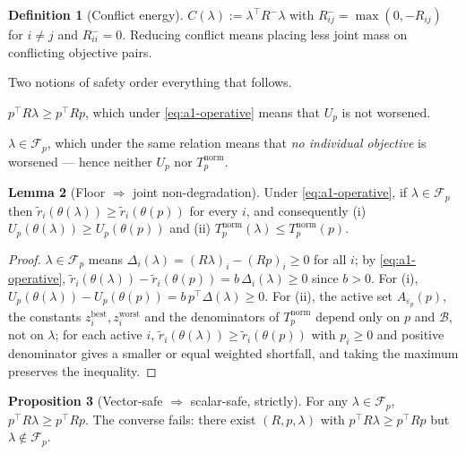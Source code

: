 \documentclass[12pt,a4paper]{report}
\newcommand{\1}{\mathbf{1}}
\newcommand{\Bset}{\mathcal{B}}
\newcommand{\Floor}{\mathcal{F}_{p}}
\theoremstyle{definition}
\newtheorem{definition}{Definition}
\newtheorem{proposition}[definition]{Proposition}
\newtheorem{lemma}[definition]{Lemma}
\begin{document}
\begin{definition}[Conflict energy]
\label{def:conflict-energy}
\(C(\lambda):=\lambda^\top R^-\lambda\) with \(R^-_{ij}=\max(0,-R_{ij})\) for \(i\ne j\) and \(R^-_{ii}=0\). Reducing conflict means placing less joint mass on conflicting objective pairs.
\end{definition}

Two notions of safety order everything that follows.

\begin{description}[leftmargin=2.2em,style=nextline]
\item[\emph{Scalar safety}] \(p^\top R\lambda\ge p^\top Rp\), which under \eqref{eq:a1-operative} means that \(U_p\) is not worsened.
\item[\emph{Vector safety}] \(\lambda\in\Floor\), which under the same relation means that \emph{no individual objective} is worsened --- hence neither \(U_p\) nor \(T_p^{\mathrm{norm}}\).
\end{description}

\begin{lemma}[Floor \(\Rightarrow\) joint non-degradation]
\label{lem:floor-nondeg}
Under \eqref{eq:a1-operative}, if \(\lambda\in\Floor\) then \(\tilde r_i(\theta(\lambda))\ge\tilde r_i(\theta(p))\) for every \(i\), and consequently (i) \(U_p(\theta(\lambda))\ge U_p(\theta(p))\) and (ii) \(T_p^{\mathrm{norm}}(\lambda)\le T_p^{\mathrm{norm}}(p)\).
\end{lemma}

\begin{proof}
\(\lambda\in\Floor\) means \(\Delta_i(\lambda)=(R\lambda)_i-(Rp)_i\ge 0\) for all \(i\); by \eqref{eq:a1-operative}, \(\tilde r_i(\theta(\lambda))-\tilde r_i(\theta(p))=b\,\Delta_i(\lambda)\ge 0\) since \(b>0\). For (i), \(U_p(\theta(\lambda))-U_p(\theta(p))=b\,p^\top\Delta(\lambda)\ge 0\). For (ii), the active set \(A_{\varepsilon_p}(p)\), the constants \(z_i^{\mathrm{best}},z_i^{\mathrm{worst}}\) and the denominators of \(T_p^{\mathrm{norm}}\) depend only on \(p\) and \(\Bset\), not on \(\lambda\); for each active \(i\), \(\tilde r_i(\theta(\lambda))\ge\tilde r_i(\theta(p))\) with \(p_i\ge0\) and positive denominator gives a smaller or equal weighted shortfall, and taking the maximum preserves the inequality.
\end{proof}

\begin{proposition}[Vector-safe \(\Rightarrow\) scalar-safe, strictly]
\label{prop:vector-implies-scalar}
For any \(\lambda\in\Floor\), \(p^\top R\lambda\ge p^\top Rp\). The converse fails: there exist \((R,p,\lambda)\) with \(p^\top R\lambda\ge p^\top Rp\) but \(\lambda\notin\Floor\).
\end{proposition}
\end{document}
